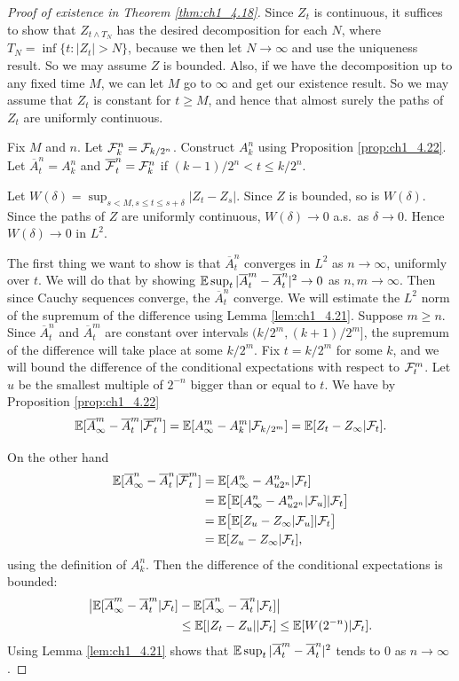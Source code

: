 \begin{proof}[Proof of existence in Theorem \ref{thm:ch1_4.18}]
Since $Z_t$ is continuous, it suffices to show that $Z_{t\wedge T_N}$ has the desired decomposition for each $N$, where $T_N = \inf\{t : |Z_t| > N\}$, because we then let $N \to \infty$ and use the uniqueness result. So we may assume $Z$ is bounded. Also, if we have the decomposition up to any fixed time $M$, we can let $M$ go to $\infty$ and get our existence result. So we may assume that $Z_t$ is constant for $t \geq M$, and hence that almost surely the paths of $Z_t$ are uniformly continuous.

Fix $M$ and $n$. Let $\mathcal{F}_k^n = \mathcal{F}_{k/2^n}$. Construct $A_k^n$ using Proposition \ref{prop:ch1_4.22}. Let $\overline{A}_t^n = A_k^n$ and $\overline{\mathcal{F}}_t^n = \mathcal{F}_k^n$ if $(k-1)/2^n < t \leq k/2^n$.

\mpagebreak

Let $W(\delta) = \sup_{s<M,s\leq t\leq s+\delta} |Z_t - Z_s|$. Since $Z$ is bounded, so is $W(\delta)$. Since the paths of $Z$ are uniformly continuous, $W(\delta) \to 0$ a.s.\ as $\delta \to 0$. Hence $W(\delta) \to 0$ in $L^2$.

The first thing we want to show is that $\overline{A}_t^n$ converges in $L^2$ as $n \to \infty$, uniformly over $t$. We will do that by showing $\mathbb{E} \sup_t |\overline{A}_t^m - \overline{A}_t^n|^2 \to 0$ as $n,m \to \infty$. Then since Cauchy sequences converge, the $\overline{A}_t^n$ converge. We will estimate the $L^2$ norm of the supremum of the difference using Lemma \ref{lem:ch1_4.21}. Suppose $m \geq n$. Since $\overline{A}_t^n$ and $\overline{A}_t^m$ are constant over intervals $(k/2^m, (k+1)/2^m]$, the supremum of the difference will take place at some $k/2^m$. Fix $t = k/2^m$ for some $k$, and we will bound the difference of the conditional expectations with respect to $\mathcal{F}_t^m$. Let $u$ be the smallest multiple of $2^{-n}$ bigger than or equal to $t$. We have by Proposition \ref{prop:ch1_4.22}
\[
    \mathbb{E}[\overline{A}_\infty^m - \overline{A}_t^m| \overline{\mathcal{F}}_t^m] = \mathbb{E}[A_\infty^m - A_k^m| \mathcal{F}_{k/2^m}] = \mathbb{E}[Z_t - Z_\infty| \mathcal{F}_t].
\]

On the other hand
\begin{align*}
    \mathbb{E}[\overline{A}_\infty^n - \overline{A}_t^n| \overline{\mathcal{F}}_t^m] &= \mathbb{E}[A_\infty^n - A_{u2^n}^n| \mathcal{F}_t] \\
    &= \mathbb{E}\big[\mathbb{E}[A_\infty^n - A_{u2^n}^n|\mathcal{F}_u]| \mathcal{F}_t\big] \\
    &= \mathbb{E}\big[\mathbb{E}[Z_u - Z_\infty| \mathcal{F}_u]|\mathcal{F}_t\big] \\
    &= \mathbb{E}[Z_u - Z_\infty| \mathcal{F}_t],
\end{align*}
using the definition of $A_k^n$. Then the difference of the conditional expectations is bounded:
\begin{align*}
    \big|\mathbb{E}[\overline{A}_\infty^m - \overline{A}_t^m| \mathcal{F}_t] &- \mathbb{E}[\overline{A}_\infty^n - \overline{A}_t^n| \mathcal{F}_t]\big| \\
    &\leq \mathbb{E}[|Z_t - Z_u|| \mathcal{F}_t] \leq \mathbb{E}[W(2^{-n})| \mathcal{F}_t].
\end{align*}
Using Lemma \ref{lem:ch1_4.21} shows that $\mathbb{E} \sup_t |\overline{A}_t^m - \overline{A}_t^n|^2$ tends to $0$ as $n \to \infty$.


\end{proof}
